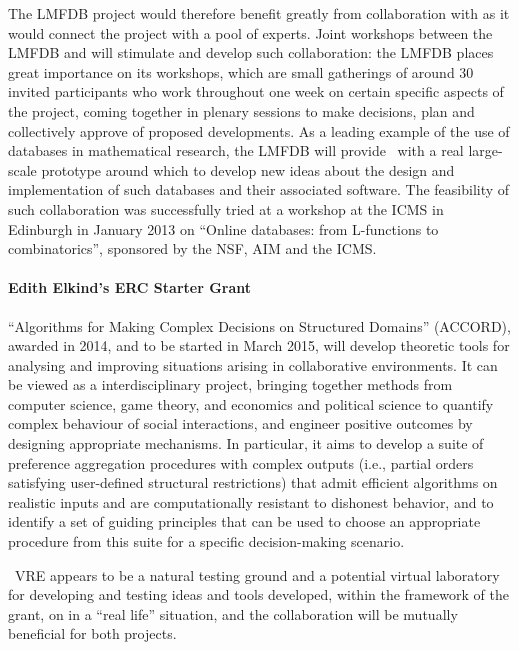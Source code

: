 The LMFDB project would therefore benefit
greatly from collaboration with \TheProject as it would connect the
project with a pool of experts.  Joint workshops between the LMFDB and
\TheProject will stimulate and develop such collaboration: the LMFDB
places great importance on its workshops, which are small gatherings
of around 30 invited participants who work throughout one week on
certain specific aspects of the project, coming together in plenary
sessions to make decisions, plan and collectively approve of proposed
developments.  As a leading example of the use of databases in
mathematical research, the LMFDB will provide \TheProject\ with a real
large-scale prototype around which to develop new ideas about the
design and implementation of such databases and their associated
software.  The feasibility of such collaboration was successfully
tried at a workshop at the ICMS in Edinburgh in January 2013 on
``Online databases: from L-functions to combinatorics'', sponsored by
the NSF, AIM and the ICMS.

\paragraph{Edith Elkind's ERC Starter Grant} 
``Algorithms for Making Complex Decisions on Structured Domains'' (ACCORD), 
awarded in 2014, and to be started in March 2015, 
will develop theoretic tools for analysing and improving situations
arising in collaborative environments. 
It can be viewed as a interdisciplinary project, bringing together methods from
computer science, game theory, and economics and political science
to quantify complex behaviour of social interactions, and engineer
positive outcomes by designing appropriate mechanisms.
In particular, it aims to develop a suite of preference aggregation procedures with complex outputs (i.e.,
partial orders satisfying user-defined structural restrictions) that admit efficient algorithms on realistic
inputs and are computationally resistant to dishonest behavior, and to identify a set of guiding 
principles that can be used to choose an appropriate procedure from this suite for a specific decision-making
scenario.

\TheProject\ VRE appears to be a natural testing ground and a potential virtual
laboratory for developing and testing ideas and tools developed, within the
framework of the grant, on in a ``real life'' situation, and the collaboration
will be mutually beneficial for both projects.

 
